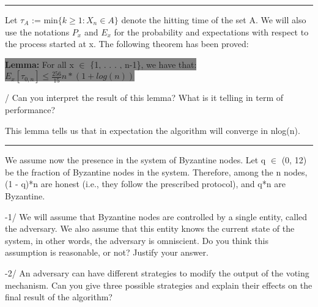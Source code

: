 \documentclass[11pt]{article}
\begin{document}
\begin{center}
    \noindent\rule{8cm}{0.4pt} 
\end{center}


\noindent Let $\tau_{A}$ := min$\{k \geq 1 : X_{n} \in A\}$ denote the hitting time of the set A. We will also use the
notations $P_{x}$ and $E_{x}$ for the probability and expectations with respect to the process started at x. The
following theorem has been proved:
\begin{center}
    \colorbox{Gray}{\textbf{Lemma:} For all x $\in$ \{1, . . . , n-1\}, we have that: $E_{x}[\tau_{0,n}] \leq \frac{256}{15}n*(1 + log(n))$}
\end{center}

\vspace{5mm}

/ Can you interpret the result of this lemma? What is it telling in term of performance?

\vspace{5mm}

This lemma tells us that in expectation the algorithm will converge in nlog(n).

\begin{center}
    \noindent\rule{8cm}{0.4pt} 
\end{center}

We assume now the presence in the system of Byzantine nodes. Let q $\in$ (0, 12) be the fraction
of Byzantine nodes in the system. Therefore, among the n nodes, (1 - q)*n are honest (i.e., they follow
the prescribed protocol), and q*n are Byzantine.

\vspace{5mm}

-1/ We will assume that Byzantine nodes are controlled by a single entity, called the adversary. We
also assume that this entity knows the current state of the system, in other words, the adversary
is omniscient. Do you think this assumption is reasonable, or not? Justify your answer. 

\vspace{5mm}



\vspace{5mm}

-2/ An adversary can have different strategies to modify the output of the voting mechanism. Can
you give three possible strategies and explain their effects on the final result of the algorithm?

\vspace{5mm}
\end{document}
